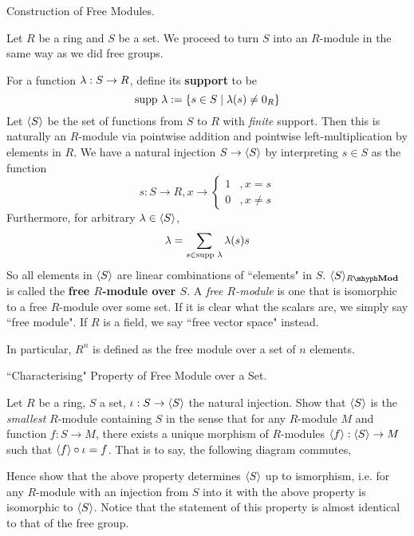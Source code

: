 \documentclass[../book.tex]{subfiles}
\begin{document}
\begin{ex} \dolater Construction of Free Modules. 

    Let $R$ be a ring and $S$ be a set. 
    We proceed to turn $S$ into an $R$-module in the same way as we did free groups.
    
    For a function $\lambda : S \to R$, define its \textbf{support} to be \[
        \text{supp } \lambda := \{s \in S \mid \lambda(s) \neq 0_R\}
    \]
    Let $\langle S \rangle$ be the set of functions from $S$ to $R$ with \emph{finite} support.
    Then this is naturally an $R$-module via pointwise addition and
    pointwise left-multiplication by elements in $R$. 
    We have a natural injection $S \to \langle S \rangle$ by
    interpreting $s \in S$ as the function \[
        s : S \to R, x \to \begin{cases}
            1   &, x = s \\
            0   &, x \neq s
        \end{cases}
    \]
    Furthermore, for arbitrary $\lambda \in \langle S \rangle$, \[
        \lambda = \sum_{s \in \text{supp } \lambda} \lambda(s) s
    \]
    So all elements in $\langle S \rangle$ are linear combinations of ``elements" in $S$. 
    $\< S\>_{\mod{R}}$ is called the \textbf{free $R$-module over $S$}.
    A \emph{free $R$-module} is one that is isomorphic 
    to a free $R$-module over some set. 
    If it is clear what the scalars are, we simply say ``free module".
    If $R$ is a field, we say ``free vector space" instead. 
    
    In particular, $R^n$ is defined as the free module over a set of $n$ elements.
\end{ex}

\begin{ex} \dolater ``Characterising" Property of Free Module over a Set. 

    Let $R$ be a ring, $S$ a set, $\iota : S \to \langle S\rangle$ the natural injection.
    Show that $\langle S\rangle$ is the \emph{smallest} $R$-module containing $S$
    in the sense that for any $R$-module $M$ and function $f : S \to M$, 
    there exists a unique morphism of $R$-modules
    $\langle f\rangle : \langle S\rangle \to M$ such that $\langle f\rangle \circ \iota = f$. 
    That is to say, the following diagram commutes, 
    \begin{figure} [ht]
        \centering
    \end{figure}
    
    Hence show that the above property determines $\langle S\rangle$ up to ismorphism, i.e.
    for any $R$-module with an injection from $S$ into it with the above property
    is isomorphic to $\langle S\rangle$. 
    Notice that the statement of this property is almost
    identical to that of the free group.
\end{ex}
\end{document}
